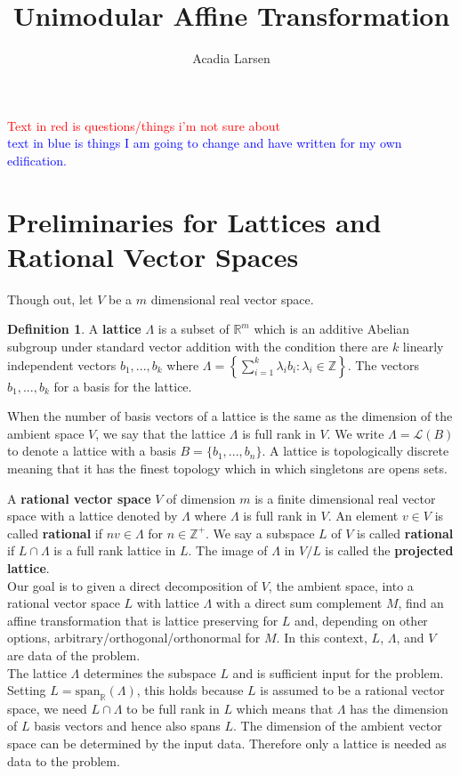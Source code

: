 \documentclass{article}
\title{Unimodular Affine Transformation}
\author{Acadia Larsen}
\newcommand{\nl}{\bigskip \\ } %
\newcommand{\Z}[0]{\mathbb{Z}}		%
\newcommand{\R}[0]{\mathbb{R}}		%
\newcommand{\La}[0]{\mathcal L}
\theoremstyle{definition}
\newtheorem{defn}[thm]{Definition}
\theoremstyle{remark}
\begin{document}
\maketitle
\textcolor{red}{Text in red is questions/things i'm not sure about}\nl 
\textcolor{blue}{text in blue is things I am going to change and have written for my own edification.}
\section{Preliminaries for Lattices and Rational Vector Spaces }
Though out, let $V$ be a $m$ dimensional real vector space. 
 \begin{defn}
 
A \textbf{lattice} $\Lambda$ is a subset of $\R^m$ which is an additive Abelian subgroup under standard vector addition with the condition there are $k$ linearly independent vectors $b_1,...,b_k$ where $\Lambda = \left\{\sum\limits_{i=1}^k \lambda_i b_i : \lambda_i \in \Z\right\}$. The vectors $b_1,...,b_k$ for a basis for the lattice. 
 \end{defn}
 When the number of basis vectors of a lattice is the same as the dimension of the ambient space $V$, we say that the lattice $\Lambda$ is full rank in $V$.  We write $\Lambda = \La(B)$ to denote a lattice with a basis $B = \{b_1,...,b_n\}$. A lattice is topologically discrete meaning that it has the finest topology which in which singletons are opens sets. 

A \textbf{rational vector space} $V$ of dimension $m$ is a finite dimensional real vector space with a lattice denoted by $\Lambda$ where $\Lambda$ is full rank in $V$. An element $v\in V$ is called \textbf{rational} if $nv\in \Lambda$ for $n\in \Z^+$. We say a subspace $L$ of $V$ is called \textbf{rational} if $L\cap \Lambda$ is a full rank lattice in $L$. The image of $\Lambda$ in $V /L$ is called the \textbf{projected lattice}.\cite{Baldoni_2012} \nl 

Our goal is to given a direct decomposition of $V$, the ambient space, into a rational vector space $L$ with lattice $\Lambda$ with a direct sum complement $M$, find an affine transformation that is lattice preserving for $L$ and, depending on other options, arbitrary/orthogonal/orthonormal for $M$. In this context, $L$, $\Lambda$, and $V$ are data of the problem.  \nl 

The lattice $\Lambda$ determines the subspace $L$ and is sufficient input for the problem. Setting $L  =\text{span}_\R(\Lambda)$, this holds because $L$ is assumed to be a rational vector space, we need $L\cap \Lambda$ to be full rank in $L$ which means that $\Lambda$ has the dimension of $L$ basis vectors and hence also spans $L$. The dimension of the ambient vector space can be determined by the input data.  Therefore only a lattice is needed as data to the problem. \nl 
\end{document}
